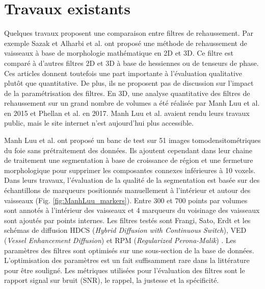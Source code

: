 \section{Travaux existants}

 Quelques travaux proposent une comparaison entre filtres de rehaussement. Par exemple Sazak et Alharbi et al. \cite{Alharbi2018_TP_2D_3D} \cite{Sazak2019_bowler_hat_2D}  ont proposé une méthode de rehaussement de vaisseaux à base de morphologie mathématique en 2D et 3D. Ce filtre est comparé à d'autres filtres 2D et 3D à base de hessiennes ou de tenseurs de phase. Ces articles donnent toutefois une part importante à l'évaluation qualitative plutôt que quantitative. De plus, ils ne proposent pas de discussion sur l'impact de la paramétrisation des filtres. En 3D, une analyse quantitative des filtres de rehaussement sur un grand nombre de volumes a été réalisée par Manh Luu et al. en 2015 \cite{Luu2015_liver_vesselness_comparison} et Phellan et al. \cite{Phellan2017_Brain_vesselness_comparison} en 2017. Manh Luu et al. avaient rendu leurs travaux public, mais le site internet n'est aujourd'hui plus accessible.

Manh Luu et al. \cite{Luu2015_liver_vesselness_comparison} ont proposé un banc de test sur 51 images tomodensitométriques du foie sans prétraitement des données. Ils ajoutent cependant dans leur chaine de traitement une segmentation à base de croissance de région et une fermeture morphologique pour supprimer les composantes connexes inférieures à 10 voxels. Dans leurs travaux, l'évaluation de la qualité de la segmentation est basée sur des échantillons de marqueurs positionnés manuellement à l'intérieur et autour des vaisseaux (Fig. \ref{fig:ManhLuu_markers}). Entre 300 et 700 points par volumes sont annotés à l'intérieur des vaisseaux et 4 marqueurs du voisinage des vaisseaux sont ajoutés par points internes. Les filtres testés sont Frangi, Sato, Erdt \cite{Erdt2008_liver_vesselness} et les schémas de diffusion HDCS (\textit{Hybrid Diffusion with Continuous Switch}), VED (\textit{Vessel Enhancement Diffusion}) et RPM (\textit{Regularized Perona-Malik}) \cite{Perona1990_RPM}. Les paramètres des filtres sont optimisés sur une sous-section de la base de données. L'optimisation des paramètres est un fait suffisamment rare dans la littérature pour être souligné. Les métriques utilisées pour l'évaluation des filtres sont le rapport signal sur bruit (SNR), le rappel, la justesse et la spécificité.

